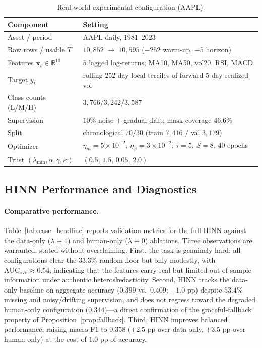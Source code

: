 \begin{table}[!htb]
  \centering\small
  \caption{Real-world experimental configuration (AAPL).}
  \label{tab:case_config}
  \begin{tabularx}{\linewidth}{l X}
    \toprule
    \textbf{Component} & \textbf{Setting} \\
    \midrule
    Asset / period & AAPL daily, $1981$--$2023$ \\
    Raw rows / usable $T$ & $10{,}852 \;\rightarrow\; 10{,}595$ ($-252$ warm-up, $-5$ horizon) \\
    Features $\bm{x}_t\!\in\!\mathbb{R}^{10}$ & $5$ lagged log-returns; MA10, MA50, vol20, RSI, MACD \\
    Target $y_t$ & rolling $252$-day local terciles of forward $5$-day realized vol \\
    Class counts (L/M/H) & $3{,}766 / 3{,}242 / 3{,}587$ \\
    Supervision & $10\%$ noise $+$ gradual drift; mask coverage $46.6\%$ \\
    Split & chronological $70/30$ (train $7{,}416$ / val $3{,}179$) \\
    Optimizer & $\eta_m\!=\!5\!\times\!10^{-2}$, $\eta_\varphi\!=\!3\!\times\!10^{-2}$, $\tau\!=\!5$, $S\!=\!8$, $40$ epochs \\
    Trust $(\lambda_{\min},\alpha,\gamma,\kappa)$ & $(0.5,\,1.5,\,0.05,\,2.0)$ \\
    \bottomrule
  \end{tabularx}
\end{table}

\subsection{HINN Performance and Diagnostics}
\label{sec:case_perf}

\paragraph{Comparative performance.}
Table~\ref{tab:case_headline} reports validation metrics for the full HINN
against the data-only ($\lambda\!\equiv\!1$) and human-only
($\lambda\!\equiv\!0$) ablations. Three observations are warranted, stated
without overclaiming. First, the task is genuinely hard: all configurations
clear the $33.3\%$ random floor but only modestly, with
$\mathrm{AUC}_{\mathrm{ovo}}\approx 0.54$, indicating that the features carry
real but limited out-of-sample information under authentic heteroskedasticity.
Second, HINN tracks the data-only baseline on aggregate accuracy
($0.399$ vs.\ $0.409$; $-1.0$ pp) despite $53.4\%$ missing and noisy/drifting
supervision, and does not regress toward the degraded human-only configuration
($0.344$)---a direct confirmation of the graceful-fallback property of
Proposition~\ref{prop:fallback}. Third, HINN improves balanced performance,
raising macro-F1 to $0.358$ ($+2.5$ pp over data-only, $+3.5$ pp over
human-only) at the cost of $1.0$ pp of accuracy.

